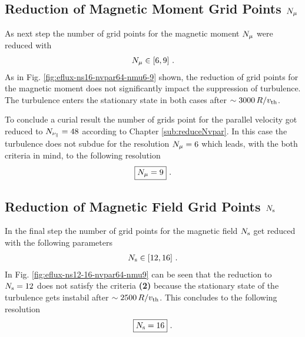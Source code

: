 \subsection{Reduction of Magnetic Moment Grid Points $N_\mu$}
\label{sub:reduceNmu}

As next step the number of grid points for the magnetic moment $N_\mu$ were reduced with
\begin{gather*}
	N_\mu \in [6, 9] ~.
\end{gather*}
As in Fig. \ref{fig:eflux-ns16-nvpar64-nmu6-9} shown, the reduction of grid points for the magnetic moment does not significantly impact the suppression of turbulence. The turbulence enters the stationary state in both cases after $\sim 3000\,R/v_{\mathrm{th}}$.  


To conclude a curial result the number of grids point for the parallel velocity got reduced to $N_{\nu_\parallel} = 48$ according to Chapter \ref{sub:reduceNvpar}. In this case the turbulence does not subdue for the resolution $N_\mu = 6$ which leads, with the both criteria in mind, to the following resolution
\begin{gather*}
	\boxed{N_\mu = 9}~.
\end{gather*}


\subsection{Reduction of Magnetic Field Grid Points $N_\mathrm{s}$}
\label{sub:reduceNs}

In the final step the number of grid points for the magnetic field $N_\mathrm{s}$ get reduced with the following parameters
\begin{gather*}
	N_\mathrm{s} \in [12, 16]~.
\end{gather*}
In Fig. \ref{fig:eflux-ns12-16-nvpar64-nmu9} can be seen that the reduction to $N_\mathrm{s} = 12$ does not satisfy the criteria \textbf{(2)} because the stationary state of the turbulence gets instabil after $\sim 2500\,R/v_{\mathrm{th}}$. This concludes to the following resolution
\begin{gather*}
	\boxed{N_\mathrm{s} = 16}~.
\end{gather*}

